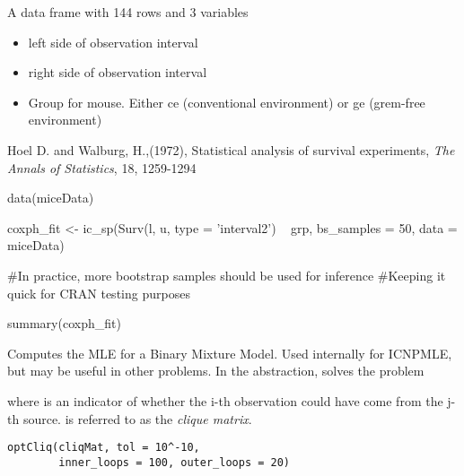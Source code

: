 \documentclass[a4paper]{book}
\begin{document}
%
\begin{Format}
A data frame with 144 rows and 3 variables	
\begin{itemize}

\item {}   left side of observation interval
\item {}   right side of observation interval
\item {}   Group for mouse. Either ce (conventional environment) or ge (grem-free environment)

\end{itemize}

\end{Format}
%
\begin{Source}\relax
Hoel D. and Walburg, H.,(1972), Statistical analysis of survival experiments, \emph{The Annals of Statistics}, 18, 1259-1294 
\end{Source}
%
\begin{Examples}
\begin{ExampleCode}
	data(miceData)
	
	coxph_fit <- ic_sp(Surv(l, u, type = 'interval2') ~ grp, 
	                   bs_samples = 50,	
	                   data = miceData)
	
	#In practice, more bootstrap samples should be used for inference
	#Keeping it quick for CRAN testing purposes 
	
	summary(coxph_fit)
\end{ExampleCode}
\end{Examples}
%
\begin{Description}\relax
Computes the MLE for a Binary Mixture Model. Used internally for ICNPMLE, but may be useful in other problems. In the abstraction, solves the problem 


where  is an indicator of whether the i-th observation could have come from the j-th source.  is referred to as the \emph{clique matrix}.

\end{Description}
%
\begin{Usage}
\begin{verbatim}
optCliq(cliqMat, tol = 10^-10, 
        inner_loops = 100, outer_loops = 20)
\end{verbatim}
\end{Usage}
\end{document}
